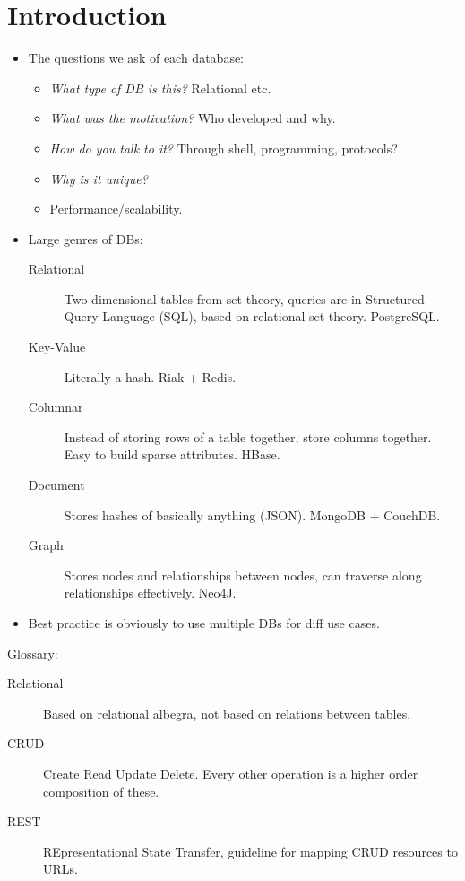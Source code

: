 \documentclass[10pt]{article}
\begin{document}
\onehalfspacing

\pagestyle{fancy}
\cfoot{\thepage/\pageref{LastPage}}

\section{Introduction}

\begin{itemize}
    \item The questions we ask of each database:
        \begin{itemize}
            \item \emph{What type of DB is this?} Relational etc.
            \item \emph{What was the motivation?} Who developed and why.
            \item \emph{How do you talk to it?} Through shell, programming,
                protocols?
            \item \emph{Why is it unique?}
            \item Performance/scalability.
        \end{itemize}
    \item Large genres of DBs:
        \begin{description}
            \item[Relational] Two-dimensional tables from set theory, queries
                are in Structured Query Language (SQL), based on relational set
                theory. PostgreSQL.\@
            \item[Key-Value] Literally a hash. Riak + Redis.
            \item[Columnar] Instead of storing rows of a table together, store
                columns together. Easy to build sparse attributes. HBase.
            \item[Document] Stores hashes of basically anything (JSON). MongoDB
                + CouchDB.\@
            \item[Graph] Stores nodes and relationships between nodes, can
                traverse along relationships effectively. Neo4J.
        \end{description}
    \item Best practice is obviously to use multiple DBs for diff use cases.
\end{itemize}

Glossary:
\begin{description}
    \item[Relational] Based on relational albegra, not based on relations
        between tables.
    \item[CRUD] Create Read Update Delete. Every other operation is a higher
        order composition of these.
    \item[REST] REpresentational State Transfer, guideline for mapping CRUD
        resources to URLs.
\end{description}
\end{document}
